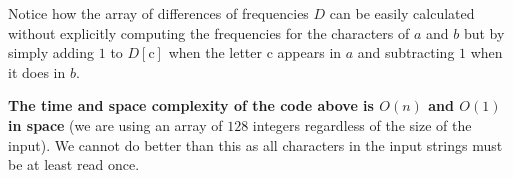 Notice how the array of differences of frequencies $D$ can be easily calculated without explicitly
computing the frequencies for the characters of $a$ and $b$ but by simply adding $1$ to $D[\mathrm{c}]$ when the letter $\mathrm{c}$ appears in $a$
and subtracting $1$ when it does in $b$. 

\textbf{The time and space complexity of the code above is $O(n)$ and $O(1)$ in space} (we are using an array of $128$ integers regardless of the size of the input). We cannot do better than this as all characters in the input strings must be at least read once.


